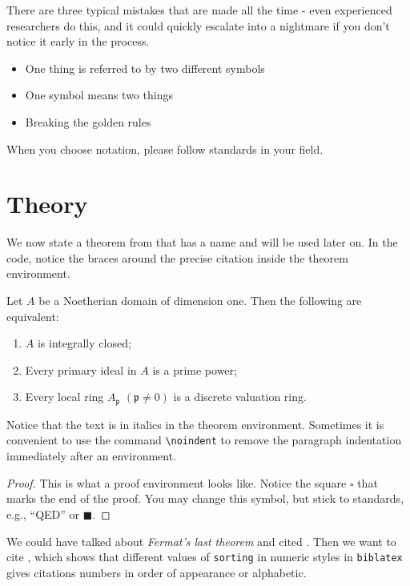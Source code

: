 There are three typical mistakes that are made all the time - even experienced researchers do this, and it could quickly escalate into a nightmare if you don't notice it early in the process.
  \begin{itemize}
      \item One thing is referred to by two different symbols
        \item One symbol means two things
    \item Breaking the golden rules
  \end{itemize}

When you choose notation, please follow standards in your field.



\section{Theory}
We now state a theorem from {\cite{AM69}} that has a name and will be used later on. In the code, notice the braces around the precise citation inside the theorem environment.
\begin{theorem}
    \label{thm:dedekind}
    Let \( A \) be a Noetherian domain of dimension one. Then the following are equivalent:
    \begin{enumerate}[leftmargin=30pt] %
        \item \( A \) is integrally closed;
        \item Every primary ideal in \( A \) is a prime power;
        \item Every local ring \( A_\mathfrak{p} \) \( (\mathfrak{p} \neq 0) \) is a discrete valuation ring.
    \end{enumerate}
\end{theorem}
\noindent Notice that the text is in italics in the theorem environment. Sometimes it is convenient to use the command \texttt{\textbackslash noindent} to remove the paragraph indentation immediately after an environment.
\begin{proof}
This is what a proof environment looks like. Notice the square $\square$ that marks the end of the proof. You may change this symbol, but stick to standards, e.g., \enquote{QED} or $\blacksquare$.
\end{proof}


We could have talked about \emph{Fermat's last theorem} and cited \cite[Theorem~1.1]{Wil93}. Then we want to cite \cite{Vie08}, which shows that different values of \texttt{sorting} in numeric styles in \texttt{biblatex} gives citations numbers in order of appearance or alphabetic.
